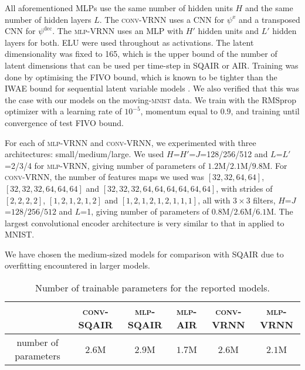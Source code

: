     All aforementioned \glspl{MLP} use the same number of hidden units $H$ and the same number of hidden layers $L$.
    The \textsc{conv}-\gls{VRNN} uses a \gls{CNN} for $\psi^{x}$ and a transposed \gls{CNN} for $\psi^{\mathrm{dec}}$. The \textsc{mlp}-\gls{VRNN} uses an \gls{MLP} with $H'$ hidden units  and $L'$ hidden layers for both. 
    \Gls{ELU} were used throughout as activations. The latent dimensionality was fixed to 165, which is the upper bound of the number of latent dimensions that can be used per time-step in \gls{SQAIR} or \gls{AIR}. Training was done by optimising the \gls{FIVO} bound, which is known to be tighter than the \gls{IWAE} bound for sequential latent variable models \citep{maddison2017filtering}. We also verified that this was the case with our models on the moving-\textsc{mnist} data. We train with the \gls{RMSprop} optimizer with a learning rate of $10^{-5}$, momentum equal to $0.9$, and training until convergence of test \gls{FIVO} bound.
    
    For each of \textsc{mlp}-\gls{VRNN} and \textsc{conv}-\gls{VRNN}, we experimented with three architectures: small/medium/large. 
    We used $H$=$H'$=$J$=128/256/512 and $L$=$L'$=2/3/4 for \textsc{mlp}-\gls{VRNN}, giving number of parameters of $1.2$M/$2.1$M/$9.8$M. 
    For \textsc{conv}-\gls{VRNN}, the number of features maps we used was $[32,32,64,64]$, $[32,32,32,64,64,64]$ and $[32,32,32,64,64,64,64,64,64]$, with strides of $[2,2,2,2]$, $[1,2,1,2,1,2]$ and $[1,2,1,2,1,2,1,1,1]$, all with $3 \times 3$ filters, $H$=$J$=$128$/$256$/$512$ and $L$=1, giving number of parameters of $0.8$M/$2.6$M/$6.1$M. 
    The largest convolutional encoder architecture is very similar to that in \cite{gulrajani2016pixelvae} applied to \gls{MNIST}.
    
    We have chosen the medium-sized models for comparison with \gls{SQAIR} due to overfitting encountered in larger models.

\begin{table}
    \centering
    \caption{Number of trainable parameters for the reported models.}
    \label{tab:num_params}
    \begin{tabular}{c|c|c|c|c|c}
         & \textsc{conv}-\gls{SQAIR} & \textsc{mlp}-\gls{SQAIR} & \textsc{mlp}-\gls{AIR} & \textsc{conv}-\gls{VRNN} & \textsc{mlp}-\gls{VRNN}\\
                         \hline
         number of parameters & $2.6$M & $2.9$M & $1.7$M & $2.6$M  & $2.1$M 
    \end{tabular}
\end{table}

